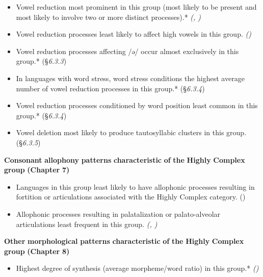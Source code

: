 \begin{itemize}
\item 
Vowel reduction most prominent in this group (most likely to be present and most likely to involve two or more distinct processes).* \textit{(, )}

\item 
Vowel reduction processes least likely to affect high vowels in this group. \textit{()}

\item 
Vowel reduction processes affecting /ə/ occur almost exclusively in this group.* (§\textit{6.3.3})

\item 
In languages with word stress, word stress conditions the highest average number of vowel reduction processes in this group.* (§\textit{6.3.4})

\item 
Vowel reduction processes conditioned by word position least common in this group.* (§\textit{6.3.4})

\item 
Vowel deletion most likely to produce tautosyllabic clusters in this group. (§\textit{6.3.5})

\end{itemize}

\textbf{Consonant} \textbf{allophony} \textbf{patterns} \textbf{characteristic} \textbf{of} \textbf{the} \textbf{Highly} \textbf{Complex} \textbf{group} \textbf{(Chapter} \textbf{7)}


\begin{itemize}
\item 
Languages in this group least likely to have allophonic processes resulting in fortition or articulations associated with the Highly Complex category. (\textit{})

\item 
Allophonic processes resulting in palatalization or palato-alveolar articulations least frequent in this group. \textit{(, )}

\end{itemize}

\textbf{Other} \textbf{morphological} \textbf{patterns} \textbf{characteristic} \textbf{of} \textbf{the} \textbf{Highly} \textbf{Complex} \textbf{group} \textbf{(Chapter} \textbf{8)}


\begin{itemize}
\item 
Highest degree of synthesis (average morpheme/word ratio) in this group.* \textit{()}

\end{itemize}


